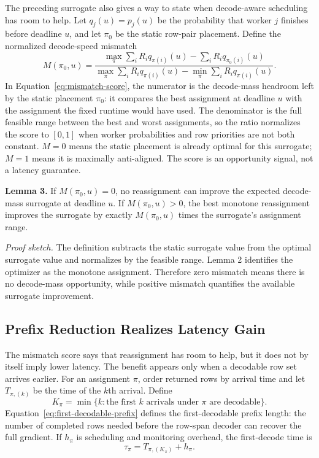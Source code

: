 The preceding surrogate also gives a way to state when decode-aware scheduling
has room to help.  Let $q_j(u)=p_j(u)$ be the probability that worker $j$
finishes before deadline $u$, and let $\pi_0$ be the static row-pair placement.
Define the normalized decode-speed mismatch
\begin{equation}
  \label{eq:mismatch-score}
  M(\pi_0,u)
  =
  \frac{
    \max_\pi \sum_i R_i q_{\pi(i)}(u)
    -
    \sum_i R_i q_{\pi_0(i)}(u)
  }{
    \max_\pi \sum_i R_i q_{\pi(i)}(u)
    -
    \min_\pi \sum_i R_i q_{\pi(i)}(u)
  } . 
\end{equation}
In Equation~\eqref{eq:mismatch-score}, the numerator is the decode-mass
headroom left by the static placement
$\pi_0$: it compares the best assignment at deadline $u$ with the assignment
the fixed runtime would have used.  The denominator is the full feasible range
between the best and worst assignments, so the ratio normalizes the score to
$[0,1]$ when worker probabilities and row priorities are not both constant.
$M=0$ means the static placement is already optimal for this surrogate; $M=1$
means it is maximally anti-aligned.  The score is an opportunity signal, not a
latency guarantee.

\textbf{Lemma 3.}
If $M(\pi_0,u)=0$, no reassignment can improve the expected decode-mass
surrogate at deadline $u$.  If $M(\pi_0,u)>0$, the best monotone reassignment
improves the surrogate by exactly $M(\pi_0,u)$ times the surrogate's assignment
range.

\textit{Proof sketch.}
The definition subtracts the static surrogate value from the optimal surrogate
value and normalizes by the feasible range.  Lemma 2 identifies the optimizer
as the monotone assignment.  Therefore zero mismatch means there is no
decode-mass opportunity, while positive mismatch quantifies the available
surrogate improvement.

\subsection{Prefix Reduction Realizes Latency Gain}

The mismatch score says that reassignment has room to help, but it does not by
itself imply lower latency.  The benefit appears only when a decodable row set
arrives earlier.  For an assignment $\pi$, order returned rows by arrival time
and let $T_{\pi,(k)}$ be the time of the $k$th arrival.  Define
\begin{equation}
  \label{eq:first-decodable-prefix}
  K_\pi = \min\{k : \text{the first } k \text{ arrivals under } \pi
  \text{ are decodable}\}.
\end{equation}
Equation~\eqref{eq:first-decodable-prefix} defines the first-decodable prefix
length: the number of completed rows needed before the row-span decoder can
recover the full gradient.  If $h_\pi$ is scheduling and monitoring overhead,
the first-decode time is
\begin{equation}
  \label{eq:first-decode-overhead}
  \tau_\pi = T_{\pi,(K_\pi)} + h_\pi .
\end{equation}

